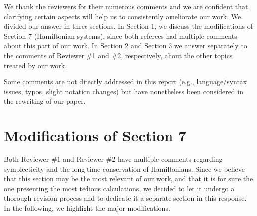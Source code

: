 \documentclass[10pt]{article}
\begin{document}
	\maketitle	

We thank the reviewers for their numerous comments and we are confident that clarifying certain aspects will help us to consistently ameliorate our work. We divided our answer in three sections. In Section 1, we discuss the modifications of Section 7 (Hamiltonian systems), since both referees had multiple comments about this part of our work. In Section 2 and Section 3 we answer separately to the comments of Reviewer \#1 and \#2, respectively, about the other topics treated by our work.

Some comments are not directly addressed in this report (e.g., language/syntax issues, typos, slight notation changes) but have nonetheless been considered in the rewriting of our paper.

\section{Modifications of Section 7}

Both Reviewer \#1 and Reviewer \#2 have multiple comments regarding symplecticity and the long-time conservation of Hamiltonians. Since we believe that this section may be the most relevant of our work, and that it is for sure the one presenting the most tedious calculations, we decided to let it undergo a thorough revision process and to dedicate it a separate section in this response. In the following, we highlight the major modifications.
\end{document}
